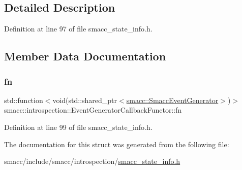 \subsection{Detailed Description}


Definition at line 97 of file smacc\+\_\+state\+\_\+info.\+h.



\subsection{Member Data Documentation}
\mbox{\label{structsmacc_1_1introspection_1_1EventGeneratorCallbackFunctor_a5c0616f83593c0d6b6de7a18d18c9f15}} 
\subsubsection{\texorpdfstring{fn}{fn}}
{\footnotesize\ttfamily std\+::function$<$void(std\+::shared\+\_\+ptr$<$\hyperlink{classsmacc_1_1SmaccEventGenerator}{smacc\+::\+Smacc\+Event\+Generator}$>$)$>$ smacc\+::introspection\+::\+Event\+Generator\+Callback\+Functor\+::fn}



Definition at line 99 of file smacc\+\_\+state\+\_\+info.\+h.



The documentation for this struct was generated from the following file\+:\begin{DoxyCompactItemize}
\item 
smacc/include/smacc/introspection/\hyperlink{smacc__state__info_8h}{smacc\+\_\+state\+\_\+info.\+h}\end{DoxyCompactItemize}
